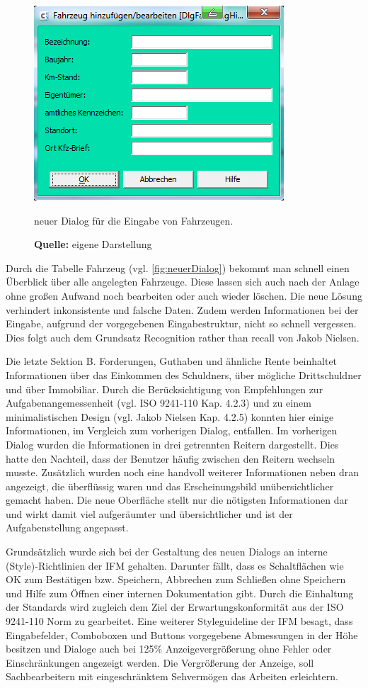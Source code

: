 \begin{figure}[H]
  \centering
  \includegraphics[scale=0.9]{img/FahrzeugAnlegenBearbeiten_Dialog.PNG}
  \caption{neuer Dialog für die Eingabe von Fahrzeugen.}
    \caption*{\textbf{Quelle:} eigene Darstellung}
  \label{fig:fahrzeugAnlegenBearbeitenDialog}
\end{figure}
Durch die Tabelle \glqq Fahrzeug\grqq{} (vgl. \ref{fig:neuerDialog}) bekommt man schnell einen Überblick über alle angelegten Fahrzeuge. Diese lassen sich auch nach der Anlage ohne großen Aufwand noch bearbeiten oder auch wieder löschen. Die neue Lösung verhindert inkonsistente und falsche Daten. Zudem werden Informationen bei der Eingabe, aufgrund der vorgegebenen Eingabestruktur, nicht so schnell vergessen. Dies folgt auch dem Grundsatz \glqq Recognition rather than recall\grqq{} von Jakob Nielsen.

Die letzte Sektion \glqq B. Forderungen, Guthaben und ähnliche Rente\grqq{} beinhaltet Informationen über das Einkommen des Schuldners, über mögliche Drittschuldner und über Immobiliar. Durch die Berücksichtigung von Empfehlungen zur Aufgabenangemessenheit (vgl. ISO 9241-110 Kap. 4.2.3) und zu einem minimalistischen Design (vgl. Jakob Nielsen Kap. 4.2.5) konnten hier einige Informationen, im Vergleich zum vorherigen Dialog, entfallen. Im vorherigen Dialog wurden die Informationen in drei getrennten Reitern dargestellt. Dies hatte den Nachteil, dass der Benutzer häufig zwischen den Reitern wechseln musste. Zusätzlich wurden noch eine handvoll weiterer Informationen neben dran angezeigt, die überflüssig waren und das Erscheinungsbild unübersichtlicher gemacht haben. Die neue Oberfläche stellt nur die nötigsten Informationen dar und wirkt damit viel aufgeräumter und übersichtlicher und ist der Aufgabenstellung angepasst.

Grundsätzlich wurde sich bei der Gestaltung des neuen Dialogs an interne (Style)-Richtlinien der IFM gehalten. Darunter fällt, dass es Schaltflächen wie \glqq OK\grqq{} zum Bestätigen bzw. Speichern, \glqq Abbrechen\grqq{} zum Schließen ohne Speichern und \glqq Hilfe\grqq{} zum Öffnen einer internen Dokumentation gibt. Durch die Einhaltung der Standards wird zugleich dem Ziel der Erwartungskonformität aus der ISO 9241-110 Norm  zu gearbeitet. Eine weiterer Styleguideline der IFM besagt, dass Eingabefelder, Comboboxen und Buttons vorgegebene Abmessungen in der Höhe besitzen und Dialoge auch bei 125\% Anzeigevergrößerung ohne Fehler oder Einschränkungen angezeigt werden. Die Vergrößerung der Anzeige, soll Sachbearbeitern mit eingeschränktem Sehvermögen das Arbeiten erleichtern.


